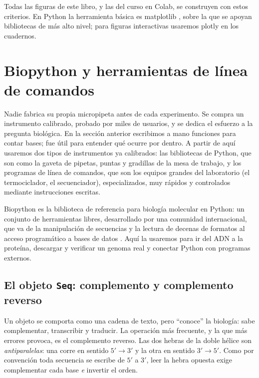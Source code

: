 Todas las figuras de este libro, y las del curso en Colab, se construyen con estos criterios. En Python la herramienta básica es matplotlib \parencite{c00-hunter2007}, sobre la que se apoyan bibliotecas de más alto nivel; para figuras interactivas usaremos plotly en los cuadernos.


\section{Biopython y herramientas de línea de comandos}\label{sec:00-biopython}

\begin{intuicion}
Nadie fabrica su propia micropipeta antes de cada experimento. Se compra un instrumento calibrado, probado por miles de usuarios, y se dedica el esfuerzo a la pregunta biológica. En la sección anterior escribimos a mano funciones para contar bases; fue útil para entender qué ocurre por dentro. A partir de aquí usaremos dos tipos de instrumentos ya calibrados: las bibliotecas de Python, que son como la gaveta de pipetas, puntas y gradillas de la mesa de trabajo, y los programas de línea de comandos, que son los equipos grandes del laboratorio (el termociclador, el secuenciador), especializados, muy rápidos y controlados mediante instrucciones escritas.
\end{intuicion}

Biopython es la biblioteca de referencia para biología molecular en Python: un conjunto de herramientas libres, desarrollado por una comunidad internacional, que va de la manipulación de secuencias y la lectura de decenas de formatos al acceso programático a bases de datos \parencite{c00-cock2009}. Aquí la usaremos para ir del ADN a la proteína, descargar y verificar un genoma real y conectar Python con programas externos.

\subsection{El objeto \texttt{Seq}: complemento y complemento reverso}

Un objeto  se comporta como una cadena de texto, pero ``conoce'' la biología: sabe complementar, transcribir y traducir. La operación más frecuente, y la que más errores provoca, es el complemento reverso. Las dos hebras de la doble hélice son \emph{antiparalelas}: una corre en sentido $5'\to3'$ y la otra en sentido $3'\to5'$. Como por convención toda secuencia se escribe de $5'$ a $3'$, leer la hebra opuesta exige complementar cada base \emph{e} invertir el orden.

